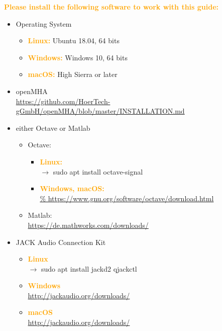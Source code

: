 \documentclass[11pt,a4paper,twoside]{article}
\newcommand{\+}{\discretionary{\mbox{\scriptsize$\hookleftarrow$}}{}{}}
\begin{document}
\textcolor{orange}{\textbf{Please install the following software to work with this guide:}}

\begin{itemize}
\item \large{{Operating System}}
  \begin{itemize}
  \item \textcolor{orange}{\textbf{Linux:}} Ubuntu 18.04, 64 bits
  \item \textcolor{orange}{\textbf{Windows:}} Windows 10, 64 bits
  \item \textcolor{orange}{\textbf{macOS:}} High Sierra or later
  \end{itemize}

\item \large{{openMHA}}   \\
  \footnotesize{\url{https://github.com/HoerTech-gGmbH/openMHA/blob/master/INSTALLATION.md}}
\item \large{{either Octave or Matlab}}
  \begin{itemize}
  \item \large{{Octave:}}
    \begin{itemize}
    \item \textcolor{orange}{\textbf{\large{Linux:}}} \\
      $\rightarrow$ {\ttfamily sudo apt install octave-signal}
    \item \textcolor{orange}{\textbf{Windows, macOS:}} \\
      \footnotesize{\url{%
          https://www.gnu.org/software/octave/download.html}}
    \end{itemize}
  \item \large{{Matlab:}} \\
    \footnotesize{\url{https://de.mathworks.com/downloads/}}
  \end{itemize}
\item \large{{JACK Audio Connection Kit}}
  \begin{itemize}
  \item \textcolor{orange}{\textbf{Linux}} \\
    $\rightarrow$ {\ttfamily sudo apt install jackd2 qjackctl}
  \item \textcolor{orange}{\textbf{Windows}} \\
    \footnotesize{\url{http://jackaudio.org/downloads/}}
  \item \textcolor{orange}{\textbf{\large{macOS}}} \\
    \footnotesize{\url{http://jackaudio.org/downloads/}}
  \end{itemize}
\end{itemize}
\end{document}
